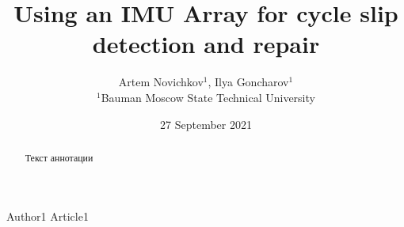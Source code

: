\documentclass{article}      %
\title{Using an IMU Array for cycle slip detection and repair}  %
\author{Artem Novichkov$^{1}$, Ilya Goncharov$^{1}$ \\
	\small $^{1}$Bauman Moscow State Technical University
}  %
\date{27 September 2021}     %
\begin{document}
\maketitle                   %

\tableofcontents

\begin{abstract}
	Текст аннотации
\end{abstract}











\begin{thebibliography}{00}
	 Author1 Article1
\end{thebibliography}
\end{document}
